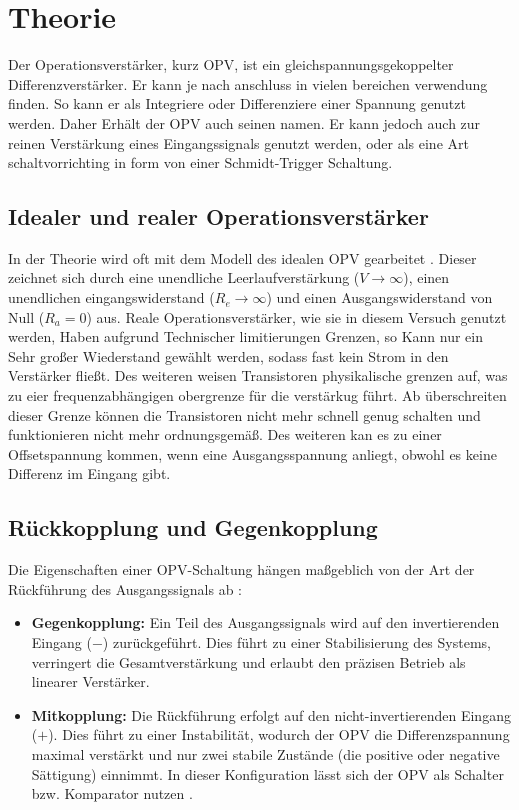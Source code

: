 \section{Theorie}
\label{sec:Theorie}


Der Operationsverstärker, kurz OPV, ist ein gleichspannungsgekoppelter Differenzverstärker. Er kann je nach anschluss in vielen bereichen verwendung finden. So kann er als Integriere oder Differenziere 
einer Spannung genutzt werden. Daher Erhält der OPV auch seinen namen. Er kann jedoch auch zur reinen Verstärkung eines Eingangssignals genutzt werden, oder als eine Art schaltvorrichting in form von 
einer Schmidt-Trigger Schaltung. 

\subsection{Idealer und realer Operationsverstärker}
In der Theorie wird oft mit dem Modell des idealen OPV gearbeitet \cite{tietzeschenk}. Dieser zeichnet sich durch eine unendliche Leerlaufverstärkung ($V \to \infty$), 
einen unendlichen eingangswiderstand ($R_e \to \infty$) und einen Ausgangswiderstand von Null ($R_a = 0$) aus.
Reale Operationsverstärker, wie sie in diesem Versuch genutzt werden, Haben aufgrund Technischer limitierungen Grenzen, so Kann nur ein Sehr großer Wiederstand gewählt werden, sodass fast 
kein Strom in den Verstärker fließt. Des weiteren weisen Transistoren physikalische grenzen auf, was zu eier frequenzabhängigen obergrenze für die verstärkug führt. Ab überschreiten dieser Grenze 
können die Transistoren nicht mehr schnell genug schalten und funktionieren nicht mehr ordnungsgemäß. Des weiteren kan es zu einer Offsetspannung kommen, wenn eine Ausgangsspannung anliegt, obwohl es 
keine Differenz im  Eingang gibt.


\subsection{Rückkopplung und Gegenkopplung}
Die Eigenschaften einer OPV-Schaltung hängen maßgeblich von der Art der Rückführung des Ausgangssignals ab \cite{demtroeder2}:
\begin{itemize}
    \item \textbf{Gegenkopplung:} Ein Teil des Ausgangssignals wird auf den invertierenden Eingang ($-$) zurückgeführt. Dies führt zu einer Stabilisierung des Systems, verringert die Gesamtverstärkung und erlaubt den präzisen Betrieb als linearer Verstärker.
    \item \textbf{Mitkopplung:} Die Rückführung erfolgt auf den nicht-invertierenden Eingang ($+$). Dies führt zu einer Instabilität, wodurch der OPV die Differenzspannung maximal verstärkt und nur zwei stabile Zustände (die positive oder negative Sättigung) einnimmt. In dieser Konfiguration lässt sich der OPV als Schalter bzw. Komparator nutzen \cite[siehe auch][]{tietzeschenk}.
\end{itemize}

